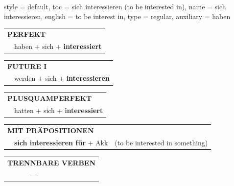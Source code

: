 \begin{verbentry}{
  style = {default},
  toc = {sich interessieren (to be interested in)},
  name = {sich interessieren},
  english = {to be interest in},
  type = {regular},
  auxiliary = {haben}
}
    \vspace{10pt}

 \begin{tabular}{rl}
     \multicolumn{2}{l}{\textbf{PERFEKT}}\\
   & haben + sich + \textbf{interessiert}\\
  \end{tabular}
\hfill
   \begin{tabular}{rl}
    \multicolumn{2}{l}{\textbf{FUTURE I} }\\
    &werden + sich + \textbf{interessieren}\\
  \end{tabular}
\hfill
   \begin{tabular}{rl}
      \multicolumn{2}{l}{\textbf{PLUSQUAMPERFEKT}}\\
   & hatten + sich + \textbf{interessiert}\\
  \end{tabular}
  
\vspace{10pt}

   \begin{tabular}{lll}
      \multicolumn{3}{l}{\textbf{MIT PRÄPOSITIONEN}}\\
& \textbf{sich interessieren für} + Akk & (to be interested in something)\\
  \end{tabular}
\hfill
\begin{tabular}{lll}
\multicolumn{3}{l}{\textbf{TRENNBARE VERBEN}}\\
& \textbf{---} & \\
\end{tabular}

  \vspace{-5pt}
\end{verbentry}

